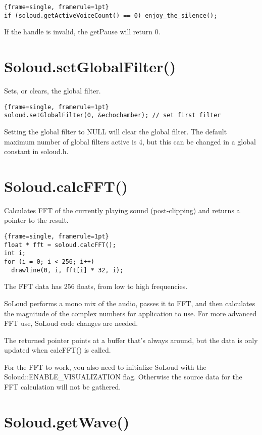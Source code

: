 \begin{lstlisting}{frame=single, framerule=1pt}
if (soloud.getActiveVoiceCount() == 0) enjoy_the_silence();
\end{lstlisting}

If the handle is invalid, the getPause will return 0.

\section{Soloud.setGlobalFilter()}

Sets, or clears, the global filter.

\begin{lstlisting}{frame=single, framerule=1pt}
soloud.setGlobalFilter(0, &echochamber); // set first filter
\end{lstlisting}

Setting the global filter to NULL will clear the global filter. The default maximum number of global filters active is 4, but this can be changed in a global constant in soloud.h.

\section{Soloud.calcFFT()}

Calculates FFT of the currently playing sound (post-clipping) and returns a pointer to the result.

\begin{lstlisting}{frame=single, framerule=1pt}
float * fft = soloud.calcFFT();
int i;
for (i = 0; i < 256; i++)
  drawline(0, i, fft[i] * 32, i);
\end{lstlisting}

The FFT data has 256 floats, from low to high frequencies.

SoLoud performs a mono mix of the audio, passes it to FFT, and then calculates the magnitude of the complex numbers for application to use. For more advanced FFT use, SoLoud code changes are needed.

The returned pointer points at a buffer that's always around, but the data is only updated when calcFFT() is called.

For the FFT to work, you also need to initialize SoLoud with the Soloud::ENABLE\_VISUALIZATION flag. Otherwise the source data for the FFT calculation will not be gathered.

\section{Soloud.getWave()}

